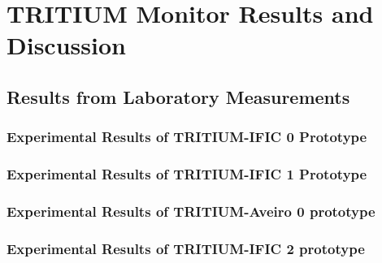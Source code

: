\documentclass[12pt,a4paper]{book}
\begin{document}
\chapter{TRITIUM Monitor Results and Discussion}\label{chap:ResultsPrototypes}
	
	
	\section{Results from Laboratory Measurements}\label{sec:ResultsLaboratoryPrototypes}
	
		
		\subsection[Experimental Results of TRITIUM-IFIC 0]{Experimental Results of TRITIUM-IFIC 0 Prototype}\label{subsec:ResultsTritiumIFIC0}
		
		
		\subsection[Experimental Results of TRITIUM-IFIC 1]{Experimental Results of TRITIUM-IFIC 1 Prototype}\label{subsec:ResultsTritiumIFIC1}
		
		
		\subsection[Experimental Results of TRITIUM-Aveiro 0]{Experimental Results of TRITIUM-Aveiro 0 prototype}\label{subsec:ResultsTritiumAveiro}
		
		
		\subsection[Experimental Results of TRITIUM-IFIC 2]{Experimental Results of TRITIUM-IFIC 2 prototype}\label{subsec:ResultsTritiumIFIC2}
		
		
\end{document}
